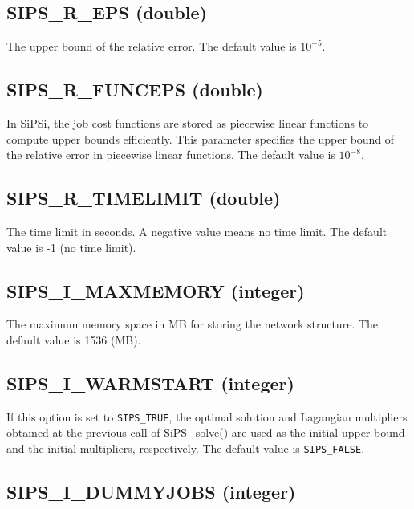 \documentclass[a4paper]{book}
\begin{document}
\hypertarget{EPS}{%
\subsection{SIPS\_R\_EPS (double)}
}

The upper bound of the relative error.
The default value is $10^{-5}$.

\hypertarget{FUNCEPS}{%
\subsection{SIPS\_R\_FUNCEPS (double)}
}

In SiPSi, the job cost functions are stored as piecewise linear functions to compute upper bounds efficiently.
This parameter specifies the upper bound of the relative error in piecewise linear functions.
The default value is $10^{-8}$.

\hypertarget{TIMELIMIT}{%
\subsection{SIPS\_R\_TIMELIMIT (double)}
}

The time limit in seconds.  A negative value means no time limit.
The default value is -1 (no time limit).

\hypertarget{MAXMEMORY}{%
\subsection{SIPS\_I\_MAXMEMORY (integer)}
}

The maximum memory space in MB for storing the network structure.
The default value is 1536 (MB).

\hypertarget{WARMSTART}{%
\subsection{SIPS\_I\_WARMSTART (integer)}
}

If this option is set to \verb+SIPS_TRUE+, the optimal solution and Lagangian multipliers obtained at the previous call of \hyperlink{SiPS_solve}{SiPS\_solve()} are used as the initial upper bound and the initial multipliers, respectively.
The default value is \verb+SIPS_FALSE+.


\hypertarget{DUMMYJOBS}{%
\subsection{SIPS\_I\_DUMMYJOBS (integer)}
}
\end{document}
